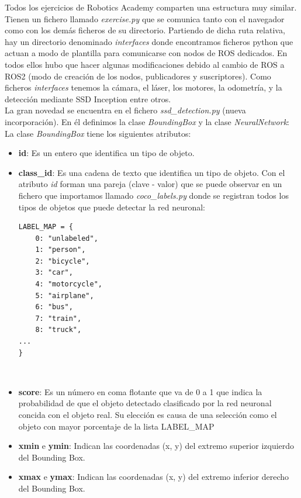 Todos los ejercicios de Robotics Academy comparten una estructura muy similar. Tienen un fichero llamado \textit{exercise.py} que se comunica tanto con el navegador como con los demás ficheros de su directorio. Partiendo de dicha ruta relativa, hay un directorio denominado \textit{interfaces} donde encontramos ficheros python que actuan a modo de plantilla para comunicarse con nodos de ROS dedicados. En todos ellos hubo que hacer algunas modificaciones debido al cambio de ROS a ROS2 (modo de creación de los nodos, publicadores y suscriptores). Como ficheros \textit{interfaces} tenemos la cámara, el láser, los motores, la odometría, y la detección mediante SSD Inception entre otros.\\

La gran novedad se encuentra en el fichero \textit{ssd\_detection.py} (nueva incorporación). En él definimos la clase \textit{BoundingBox} y la clase \textit{NeuralNetwork}:\\

La clase \textit{BoundingBox} tiene los siguientes atributos:
\begin{itemize}
	\item \textbf{id}: Es un entero que identifica un tipo de objeto.
	\item \textbf{class\_id}: Es una cadena de texto que identifica un tipo de objeto. Con el atributo \textit{id} forman una pareja (clave - valor) que se puede observar en un fichero que importamos llamado \textit{coco\_labels.py} donde se registran todos los tipos de objetos que puede detectar la red neuronal:\\
\begin{lstlisting}
LABEL_MAP = {
    0: "unlabeled",
    1: "person",
    2: "bicycle",
    3: "car",
    4: "motorcycle",
    5: "airplane",
    6: "bus",
    7: "train",
    8: "truck",
...
}
\end{lstlisting}\
	\item \textbf{score}: Es un número en coma flotante que va de 0 a 1 que indica la probabilidad de que el objeto detectado clasificado por la red neuronal concida con el objeto real. Su elección es causa de una selección como el objeto con mayor porcentaje de la lista LABEL\_MAP
	\item \textbf{xmin} e \textbf{ymin}: Indican las coordenadas (x, y) del extremo superior izquierdo del Bounding Box.
	\item \textbf{xmax} e \textbf{ymax}: Indican las coordenadas (x, y) del extremo inferior derecho del Bounding Box.
\end{itemize}\

